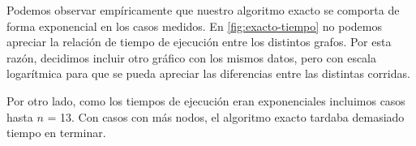 Podemos observar empíricamente que nuestro algoritmo exacto se comporta de forma exponencial en los casos medidos. En \ref{fig:exacto-tiempo} no podemos apreciar la relación de tiempo de ejecución entre los distintos grafos. Por esta razón, decidimos incluir otro gráfico con los mismos datos, pero con escala logarítmica para que se pueda apreciar las diferencias entre las distintas corridas.

Por otro lado, como los tiempos de ejecución eran exponenciales incluimos casos hasta $n$ = 13. Con casos con más nodos, el algoritmo exacto tardaba demasiado tiempo en terminar.